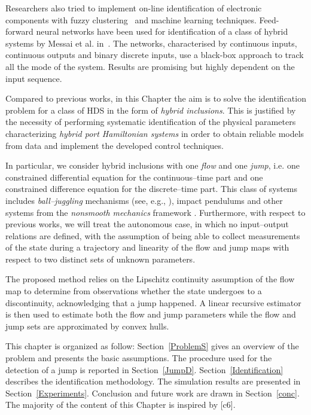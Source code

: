 Researchers also tried to implement on-line identification of electronic components with fuzzy clustering~\citep{sepasi2008line} and machine learning techniques.
Feed-forward neural networks have been used for identification of a class of hybrid systems by Messai et al. in~\citep{Messai,MESSAI2006217}. The networks, characterised by continuous inputs, continuous outputs and binary discrete inputs, use a black-box approach to track all the mode of the system. Results are promising but highly dependent on the input sequence.

Compared to previous works, in this Chapter the aim is to solve the identification problem for a class of HDS in the form of \textit{hybrid inclusions}. This is justified by the necessity of performing systematic identification of the physical parameters characterizing \textit{hybrid port Hamiltonian systems} in order to obtain reliable models from data and implement the developed control techniques.

In particular, we consider hybrid inclusions with one \textit{flow} and one \textit{jump}, i.e. one constrained differential equation for the continuous--time part and one constrained difference equation for the discrete--time part. This class of systems includes \textit{ball--juggling} mechanisms (see, e.g., \citealp{tian2013}), impact pendulums and other systems from the \textit{nonsmooth mechanics} framework \citep{brogliato1999nonsmooth}. Furthermore, with respect to previous works, we will treat the autonomous case, in which no input--output relations are defined, with the assumption of being able to collect measurements of the state during a trajectory and linearity of the flow and jump maps with respect to two distinct sets of unknown parameters. 

The proposed method relies on the Lipschitz continuity assumption of the flow map to determine from observations whether the state undergoes to a discontinuity, acknowledging that a jump happened. 
A linear recursive estimator is then used to estimate both the flow and jump parameters while the flow and jump sets are approximated by convex hulls.

This chapter is organized as follow: Section~\ref{ProblemS} gives an overview of the problem and presents the basic assumptions. The procedure used for the detection of a jump is reported in Section~\ref{JumpD}. Section~\ref{Identification} describes the identification methodology. The simulation results are presented in Section~\ref{Experiments}. Conclusion and future work are drawn in Section~\ref{conc}.
%
The majority of the content of this Chapter is inspired by [c6].
%
